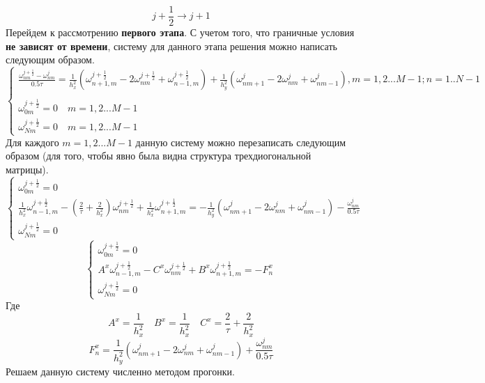\documentclass{article}
\begin{document}
$$j + \frac{1}{2} \rightarrow j+1$$
Перейдем к рассмотрению \textbf{первого этапа}. С учетом того, что граничные условия \textbf{не зависят от времени}, систему для данного этапа решения можно написать следующим образом.
\begin{equation}
    \begin{cases}
    \frac{\omega_{nm}^{j+\frac{1}{2}} - \omega^j_{nm}}{0.5\tau} = \frac{1}{h_x^2}\left(
    \omega_{n+1,m}^{j+\frac{1}{2}} - 2 \omega_{nm}^{j+\frac{1}{2}} + \omega_{n-1,m}^{j+\frac{1}{2}}
    \right)
    +
    \frac{1}{h_y^2}\left(
    \omega^j_{nm+1} - 2\omega_{nm}^{j} + \omega_{nm-1}^{j}
    \right), m=1,2...M-1; n=1..N-1\\
    \\
    \omega_{0m}^{j+\frac{1}{2}} = 0 \quad m=1,2...M-1\\
    \omega_{Nm}^{j+\frac{1}{2}} = 0 \quad m=1,2...M-1
    \end{cases}
\end{equation}
Для каждого $m=1,2...M-1$ данную систему можно перезаписать следующим образом (для того, чтобы явно была видна структура трехдиогональной матрицы).
\begin{equation}
    \begin{cases}
    \omega_{0m}^{j+\frac{1}{2}} = 0\\
    \frac{1}{h_x^2} \omega_{n-1,m}^{j+\frac{1}{2}} -  (\frac{2}{\tau}+ \frac{2}{h_x^2}) \omega_{nm}^{j+\frac{1}{2}} + \frac{1}{h_x^2} \omega_{n+1,m}^{j+\frac{1}{2}}  = -\frac{1}{h_y^2}\left(
    \omega^j_{nm+1} - 2\omega_{nm}^{j} + \omega_{nm-1}^{j}
    \right) - \frac{\omega_{nm}^j}{0.5\tau}\\
    \omega_{Nm}^{j+\frac{1}{2}} = 0 
    \end{cases}
\end{equation}
\begin{equation}
    \begin{cases}
    \omega_{0m}^{j+\frac{1}{2}} = 0\\
    A^x \omega_{n-1,m}^{j+\frac{1}{2}} -  C^x \omega_{nm}^{j+\frac{1}{2}} + B^x \omega_{n+1,m}^{j+\frac{1}{2}}  = -F^x_n\\
    \omega_{Nm}^{j+\frac{1}{2}} = 0 
    \end{cases}
\end{equation}
Где $$A^x = \frac{1}{h_x^2}\quad B^x = \frac{1}{h_x^2}\quad C^x =  \frac{2}{\tau}+ \frac{2}{h_x^2} $$
$$
F^x_n = \frac{1}{h_y^2}\left(
    \omega^j_{nm+1} - 2\omega_{nm}^{j} + \omega_{nm-1}^{j}
    \right) + \frac{\omega_{nm}^j}{0.5\tau}
$$
Решаем данную систему численно методом прогонки.
\end{document}
